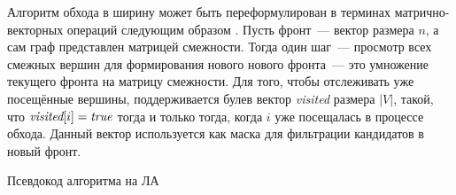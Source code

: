 Алгоритм обхода в ширину может быть переформулирован в терминах матрично-векторных операций следующим образом%
.
Пусть фронт~--- вектор размера $n$, а сам граф представлен матрицей смежности.
Тогда один шаг~--- просмотр всех смежных вершин для формирования нового нового фронта~--- это умножение текущего фронта на матрицу смежности.
Для того, чтобы отслеживать уже посещённые вершины, поддерживается булев вектор \emph{visited} размера $|V|$, такой, что $\emph{visited}[i] = \emph{true}$ тогда и только тогда, когда  $i$ уже посещалась в процессе обхода.
Данный вектор используется как маска для фильтрации кандидатов в новый фронт.

Псевдокод алгоритма на ЛА


